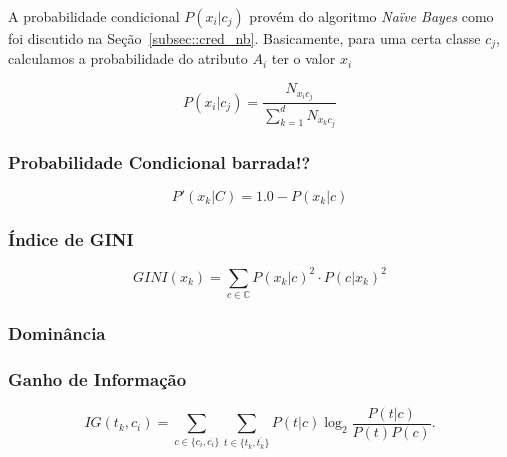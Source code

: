 A probabilidade condicional $P(x_i|c_j)$ provém do algoritmo \textit{Naïve Bayes} como foi discutido na Seção~\ref{subsec::cred_nb}.
Basicamente, para uma certa classe $c_j$, calculamos a probabilidade do atributo $A_i$ ter o valor $x_i$

\begin{equation}\label{eqn::pctalquec}
    P(x_i|c_j) = \frac{ N_{x_{i}c_{j}} }{ \sum\limits^{d}_{k = 1} { } N_{x_{k}c_{j}} } 
\end{equation}

\subsubsection{Probabilidade Condicional barrada!?}
\label{subsubsection::pc'}

\begin{equation}\label{eqn::plinhattalquec}
   P'(x_k|C) = 1.0 - P(x_k|c)
\end{equation}

\subsubsection{Índice de GINI}
\label{subsubsection::gini}

\cite{Shang07}
\begin{equation}\label{eqn::gini}
   GINI(x_k) = \sum_{c \in \mathbb{C}} P(x_k|c)^2 \cdot P(c|x_k)^2
\end{equation}

\subsubsection{Dominância}
\label{subsubsection::dom}

\subsubsection{Ganho de Informação}
\label{subsubsection::ig}

\cite{couto06}
\begin{equation}\label{eqn::ig}
   IG(t_k, c_i) = \sum_{c \in \{c_i, \overline{c_i}\}}\sum_{t \in \{t_k, \overline{t_k}\}}P(t|c)\log_2\frac{P(t|c)}{P(t)P(c)}.
\end{equation}

